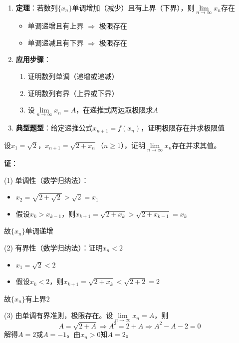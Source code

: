 \documentclass[a4paper,12pt]{article}
\begin{document}
    \begin{enumerate}
        \item \textbf{定理}：若数列$\{x_n\}$单调增加（减少）且有上界（下界），则$\lim\limits_{n\to\infty} x_n$存在
        \begin{itemize}
            \item 单调递增且有上界 $\Rightarrow$ 极限存在
            \item 单调递减且有下界 $\Rightarrow$ 极限存在
        \end{itemize}

        \item \textbf{应用步骤}：
        \begin{enumerate}
            \item 证明数列单调（递增或递减）
            \item 证明数列有界（上界或下界）
            \item 设$\lim\limits_{n\to\infty} x_n = A$，在递推式两边取极限求$A$
        \end{enumerate}

        \item \textbf{典型题型}：给定递推公式$x_{n+1} = f(x_n)$，证明极限存在并求极限值
    \end{enumerate}

    \begin{analysisbox}[示例]
        设$x_1 = \sqrt{2}$，$x_{n+1} = \sqrt{2 + x_n}$（$n \ge 1$），证明$\lim\limits_{n\to\infty} x_n$存在并求其值。

        \textbf{证}：

        (1) 单调性（数学归纳法）：
        \begin{itemize}
            \item $x_2 = \sqrt{2+\sqrt{2}} > \sqrt{2} = x_1$
            \item 假设$x_k > x_{k-1}$，则$x_{k+1} = \sqrt{2+x_k} > \sqrt{2+x_{k-1}} = x_k$
        \end{itemize}
        故$\{x_n\}$单调递增

        (2) 有界性（数学归纳法）：证明$x_n < 2$
        \begin{itemize}
            \item $x_1 = \sqrt{2} < 2$
            \item 假设$x_k < 2$，则$x_{k+1} = \sqrt{2+x_k} < \sqrt{2+2} = 2$
        \end{itemize}
        故$\{x_n\}$有上界$2$

        (3) 由单调有界准则，极限存在。设$\lim\limits_{n\to\infty} x_n = A$，则
        \[
            A = \sqrt{2+A} \Rightarrow A^2 = 2+A \Rightarrow A^2 - A - 2 = 0
        \]
        解得$A = 2$或$A = -1$。由$x_n > 0$知$A = 2$。
    \end{analysisbox}
\end{document}
